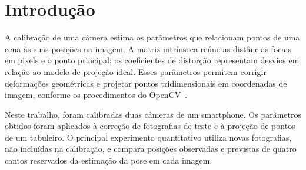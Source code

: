 \section{Introdução}

A calibração de uma câmera estima os parâmetros que relacionam pontos de uma
cena às suas posições na imagem. A matriz intrínseca reúne as distâncias focais
em pixels e o ponto principal; os coeficientes de distorção representam desvios
em relação ao modelo de projeção ideal. Esses parâmetros permitem corrigir
deformações geométricas e projetar pontos tridimensionais em coordenadas de
imagem, conforme os procedimentos do OpenCV~\cite{opencv-tutorial,opencv-calib3d}.

Neste trabalho, foram calibradas duas câmeras de um smartphone. Os parâmetros
obtidos foram aplicados à correção de fotografias de teste e à projeção de
pontos de um tabuleiro. O principal experimento quantitativo utiliza novas
fotografias, não incluídas na calibração, e compara posições observadas e
previstas de quatro cantos reservados da estimação da pose em cada imagem.
